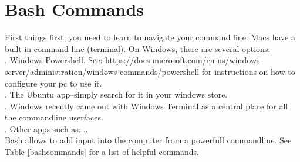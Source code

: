 \documentclass{article}
\begin{document}
\section{Bash Commands}

First things first, you need to learn to navigate your command
line. Macs have a built in command line (terminal). On Windows, there
are several options:\\
. Windows Powershell. See:
https://docs.microsoft.com/en-us/windows-
server/administration/windows-commands/powershell
for instructions on how to configure your pc to use it.\\
. The Ubuntu app--simply search for it in your windows store.\\
. Windows recently came out with Windows Terminal as a 
central place for all the commandline userfaces.\\ 
. Other apps such as:...\\
Bash allows to add input into the computer from a powerfull
commandline. See Table
\ref{bashcommands} for a list of helpful commands. 
\end{document}
